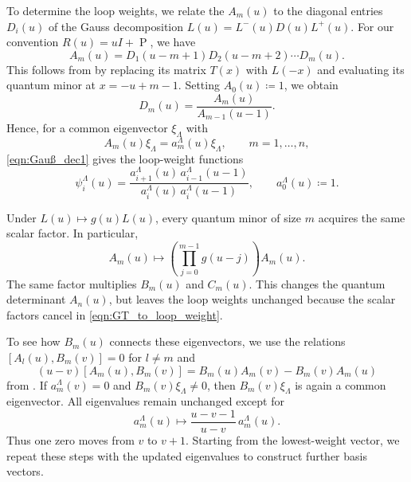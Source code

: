 \documentclass[12pt,reqno]{amsart}
\numberwithin{equation}{section}
\begin{document}
To determine the loop weights, we relate the $A_m(u)$ to the
diagonal entries $D_i(u)$ of the Gauss decomposition
$L(u)=L^-(u)D(u)L^+(u)$.
For our convention $R(u)=uI+\operatorname{P}$, we have
\begin{equation}
	A_m(u)=D_1(u-m+1)D_2(u-m+2)\cdots D_m(u).
	\label{eqn:GT_A_Gauss}
\end{equation}
This follows from \cite[Eq.~(8.5) and Theorem~8.6]{BrundanKleshchev2005}
by replacing its matrix $T(x)$ with $L(-x)$ and evaluating its
quantum minor at $x=-u+m-1$. Setting $A_0(u)\coloneqq1$, we obtain
\begin{equation}
	D_m(u)=\frac{A_m(u)}{A_{m-1}(u-1)}.
	\label{eqn:GT_D_from_A}
\end{equation}
Hence, for a common eigenvector $\xi_\Lambda$ with
\begin{equation}
	A_m(u)\xi_\Lambda=a_m^\Lambda(u)\xi_\Lambda,
	\qquad m=1,\ldots,n,
	\label{eqn:GT_A_eigenvalues}
\end{equation}
\eqref{eqn:Gauß_dec1} gives the loop-weight functions
\begin{equation}
	\psi_i^\Lambda(u)
	=
	\frac{a_{i+1}^\Lambda(u)\,a_{i-1}^\Lambda(u-1)}
	{a_i^\Lambda(u)\,a_i^\Lambda(u-1)},
	\qquad a_0^\Lambda(u)\coloneqq1.
	\label{eqn:GT_to_loop_weight}
\end{equation}

Under $L(u)\mapsto g(u)L(u)$, every quantum minor of size $m$
acquires the same scalar factor. In particular,
\begin{equation}
	A_m(u)\longmapsto
	\left(\prod_{j=0}^{m-1}g(u-j)\right)A_m(u).
	\label{eqn:GT_scalar_normalisation}
\end{equation}
The same factor multiplies $B_m(u)$ and $C_m(u)$.
This changes the quantum determinant $A_n(u)$, but leaves the
loop weights unchanged because the scalar factors cancel
in \eqref{eqn:GT_to_loop_weight}.

To see how $B_m(u)$ connects these eigenvectors, we use the relations
$[A_l(u),B_m(v)]=0$ for $l\neq m$ and
\begin{equation}
	(u-v)[A_m(u),B_m(v)]
	=
	B_m(u)A_m(v)-B_m(v)A_m(u)
	\label{eqn:GT_AB_relation}
\end{equation}
from \cite[Proposition~1.9]{NT1998}.
If $a_m^\Lambda(v)=0$ and $B_m(v)\xi_\Lambda\neq0$, then
$B_m(v)\xi_\Lambda$ is again a common eigenvector. All eigenvalues
remain unchanged except for
\begin{equation}
	a_m^\Lambda(u)
	\longmapsto
	\frac{u-v-1}{u-v}\,a_m^\Lambda(u).
	\label{eqn:GT_root_shift}
\end{equation}
Thus one zero moves from $v$ to $v+1$. Starting from the
lowest-weight vector, we repeat these steps with the updated
eigenvalues to construct further basis vectors.
\end{document}
